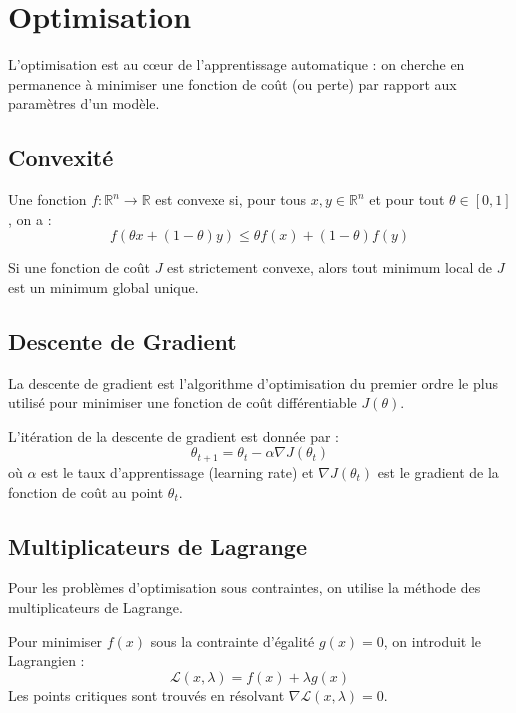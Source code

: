 \chapter{Optimisation}

L'optimisation est au cœur de l'apprentissage automatique : on cherche en permanence à minimiser une fonction de coût (ou perte) par rapport aux paramètres d'un modèle.

\section{Convexité}

\begin{definition}
Une fonction $f : \mathbb{R}^n \rightarrow \mathbb{R}$ est convexe si, pour tous $x, y \in \mathbb{R}^n$ et pour tout $\theta \in [0, 1]$, on a :
$$ f(\theta x + (1-\theta)y) \leq \theta f(x) + (1-\theta)f(y) $$
\end{definition}

\begin{theorem}
Si une fonction de coût $J$ est strictement convexe, alors tout minimum local de $J$ est un minimum global unique.
\end{theorem}

\section{Descente de Gradient}

La descente de gradient est l'algorithme d'optimisation du premier ordre le plus utilisé pour minimiser une fonction de coût différentiable $J(\theta)$.

\begin{definition}
L'itération de la descente de gradient est donnée par :
$$ \theta_{t+1} = \theta_t - \alpha \nabla J(\theta_t) $$
où $\alpha$ est le taux d'apprentissage (learning rate) et $\nabla J(\theta_t)$ est le gradient de la fonction de coût au point $\theta_t$.
\end{definition}

\section{Multiplicateurs de Lagrange}

Pour les problèmes d'optimisation sous contraintes, on utilise la méthode des multiplicateurs de Lagrange.

\begin{definition}[Lagrangien]
Pour minimiser $f(x)$ sous la contrainte d'égalité $g(x) = 0$, on introduit le Lagrangien :
$$ \mathcal{L}(x, \lambda) = f(x) + \lambda g(x) $$
Les points critiques sont trouvés en résolvant $\nabla \mathcal{L}(x, \lambda) = 0$.
\end{definition}
